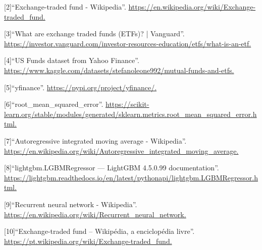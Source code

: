 \documentclass[10pt]{article}
\begin{document}
\label{csl:2}[2]``{Exchange-traded fund - Wikipedia}''. \url{https://en.wikipedia.org/wiki/Exchange-traded_fund.}

\label{csl:3}[3]``{What are exchange traded funds (ETFs)? | Vanguard}''. \url{https://investor.vanguard.com/investor-resources-education/etfs/what-is-an-etf.}

\label{csl:4}[4]``{US Funds dataset from Yahoo Finance}''. \url{https://www.kaggle.com/datasets/stefanoleone992/mutual-funds-and-etfs.}

\label{csl:5}[5]``{yfinance}''. \url{https://pypi.org/project/yfinance/.}

\label{csl:6}[6]``{root_mean_squared_error}''. \url{https://scikit-learn.org/stable/modules/generated/sklearn.metrics.root_mean_squared_error.html.}

\label{csl:7}[7]``{Autoregressive integrated moving average - Wikipedia}''. \url{https://en.wikipedia.org/wiki/Autoregressive_integrated_moving_average.}

\label{csl:8}[8]``{lightgbm.LGBMRegressor — LightGBM 4.5.0.99 documentation}''. \url{https://lightgbm.readthedocs.io/en/latest/pythonapi/lightgbm.LGBMRegressor.html.}

\label{csl:9}[9]``{Recurrent neural network - Wikipedia}''. \url{https://en.wikipedia.org/wiki/Recurrent_neural_network.}

\label{csl:0}[10]``{Exchange-traded fund – Wikipédia, a enciclopédia livre}''. \url{https://pt.wikipedia.org/wiki/Exchange-traded_fund.}
\end{document}
